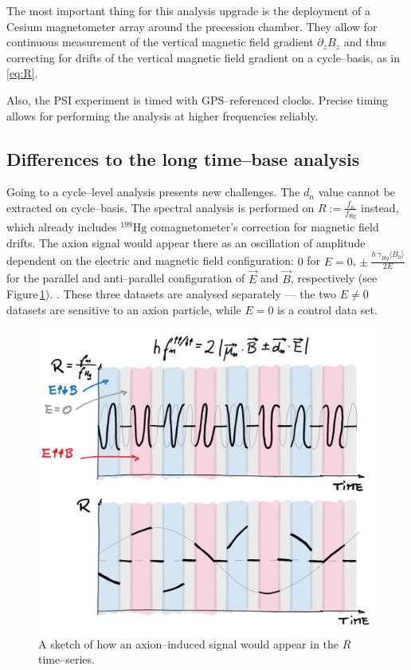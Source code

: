 The most important thing for this analysis upgrade is the deployment of a Cesium magnetometer array  around the precession chamber. They allow for continuous measurement of the vertical magnetic field gradient $\partial_z B_z$ and thus correcting for drifts of the vertical magnetic field gradient on a cycle--basis, as in \ref{eq:R}.

Also, the PSI experiment is timed with GPS--referenced clocks. Precise timing allows for performing the analysis at higher frequencies reliably. 

\subsection{Differences to the long time--base analysis}
Going to a cycle--level analysis presents new challenges. The $d_n$ value cannot be extracted on cycle--basis. The spectral analysis is performed on $R := \frac{f_n}{f_{\mathrm{Hg}}}$ instead, which already includes $^{199}\mathrm{Hg}$ comagnetometer's correction for magnetic field drifts. The axion signal would appear there as an oscillation of amplitude dependent on the electric and magnetic field configuration: $0$ for $E=0$, $\pm \ \frac{h\, \gamma_{Hg} \langle B_0 \rangle }{2 E}$ for the parallel and anti--parallel configuration of $\vec{E}$ and $\vec{B}$, respectively (see Figure\,\ref{fig:cycle-level_phase_flip}). . These three datasets are analysed separately --- the two $E \neq 0$ datasets are sensitive to an axion particle, while $E=0$ is a control data set.

\begin{figure}[htb]
  \centering \includegraphics[width=\linewidth]{gfx/axions/cycle-level_phase_flip.png}
  \caption{A sketch of how an axion--induced signal would appear in the $R$ time--series.}
  \label{fig:cycle-level_phase_flip}
\end{figure}

